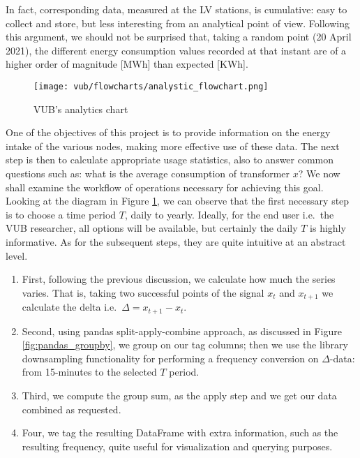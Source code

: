 In fact, corresponding data, measured at the \ac{LV} stations, is cumulative: easy to collect and store, but less interesting from an analytical point of view. 
Following this argument, we should not be surprised that, taking a random point (20 April 2021), the different energy consumption values recorded at that instant 
are of a higher order of magnitude [MWh] than expected [KWh].
\begin{figure}[ht]
    \texttt{[image: vub/flowcharts/analystic\_flowchart.png]}
    \caption{\ac{VUB}'s analytics chart}
    \label{fig:vub_anal_chart}
\end{figure}

One of the objectives of this project is to provide information on the energy intake of the various nodes, making more effective use of these data. 
The next step is then to calculate appropriate usage statistics, also to answer common questions such as: what is the average consumption of transformer $x$?
We now shall examine the workflow of operations necessary for achieving this goal.
Looking at the diagram in Figure \ref{fig:vub_anal_chart}, we can observe that the first necessary step is to choose a time period $T$, daily to yearly.
Ideally, for the end user i.e.\ the VUB researcher, all options will be available, but certainly the daily $T$ is highly informative.
As for the subsequent steps, they are quite intuitive at an abstract level.
\begin{enumerate}
    \item First, following the previous discussion, we calculate how much the series varies. 
    That is, taking two successful points of the signal $x_t$ and $x_{t+1}$ we calculate the delta i.e.\ $\Delta = x_{t+1} - x_t$.
    \item Second, using pandas split-apply-combine approach, as discussed in Figure \ref{fig:pandas_groupby}, we group on our tag columns; then we use the library downsampling 
    functionality for performing a frequency conversion on $\Delta$-data: from 15-minutes to the selected $T$ period.
    \item Third, we compute the group sum, as the apply step and we get our data combined as requested.
    \item Four, we tag the resulting DataFrame with extra information, such as the resulting frequency, quite useful for visualization and querying purposes.
\end{enumerate}

